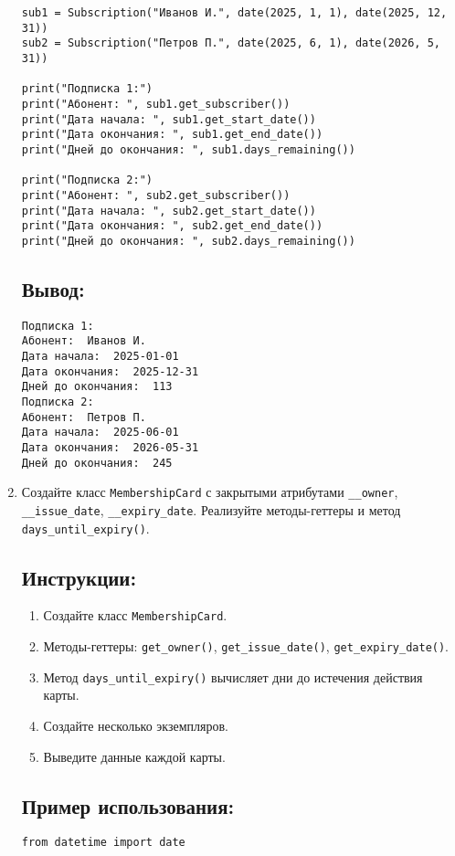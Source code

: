 \begin{enumerate}
\begin{lstlisting}[caption=Пример кода]
sub1 = Subscription("Иванов И.", date(2025, 1, 1), date(2025, 12, 31))
sub2 = Subscription("Петров П.", date(2025, 6, 1), date(2026, 5, 31))

print("Подписка 1:")
print("Абонент: ", sub1.get_subscriber())
print("Дата начала: ", sub1.get_start_date())
print("Дата окончания: ", sub1.get_end_date())
print("Дней до окончания: ", sub1.days_remaining())

print("Подписка 2:")
print("Абонент: ", sub2.get_subscriber())
print("Дата начала: ", sub2.get_start_date())
print("Дата окончания: ", sub2.get_end_date())
print("Дней до окончания: ", sub2.days_remaining())
\end{lstlisting}

\subsection*{Вывод:}
\begin{lstlisting}[caption=Ожидаемый вывод]
Подписка 1:
Абонент:  Иванов И.
Дата начала:  2025-01-01
Дата окончания:  2025-12-31
Дней до окончания:  113
Подписка 2:
Абонент:  Петров П.
Дата начала:  2025-06-01
Дата окончания:  2026-05-31
Дней до окончания:  245
\end{lstlisting}

\item
Создайте класс \texttt{MembershipCard} с закрытыми атрибутами \texttt{\_\_owner}, \texttt{\_\_issue\_date}, \texttt{\_\_expiry\_date}. Реализуйте методы-геттеры и метод \texttt{days\_until\_expiry()}.

\subsection*{Инструкции:}
\begin{enumerate}
    \item Создайте класс \texttt{MembershipCard}.
    \item Методы-геттеры: \texttt{get\_owner()}, \texttt{get\_issue\_date()}, \texttt{get\_expiry\_date()}.
    \item Метод \texttt{days\_until\_expiry()} вычисляет дни до истечения действия карты.
    \item Создайте несколько экземпляров.
    \item Выведите данные каждой карты.
\end{enumerate}

\subsection*{Пример использования:}
\begin{lstlisting}[caption=Пример кода]
from datetime import date


\end{lstlisting}
\end{enumerate}
